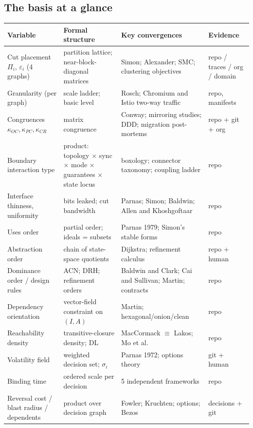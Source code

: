 \documentclass[11pt,oneside]{article}
\theoremstyle{definition}
\begin{document}
\subsection{The basis at a glance}

\begin{center}
\small
\begin{longtable}{@{}p{}p{}p{}p{}@{}}
\toprule
\textbf{Variable} & \textbf{Formal structure} & \textbf{Key convergences} & \textbf{Evidence} \\
\midrule
\endhead
Cut placement $\Pi_i$, $\varepsilon_i$ (4 graphs) & partition lattice; near-block-diagonal matrices & Simon; Alexander; SMC; clustering objectives & repo / traces / org / domain \\
Granularity (per graph) & scale ladder; basic level & Rosch; Chromium and Istio two-way traffic & repo, manifests \\
Congruences $\kappa_{OC},\kappa_{PC},\kappa_{CR}$ & matrix congruence & Conway; mirroring studies; DDD; migration post-mortems & repo + git + org \\
Boundary interaction type & product: topology $\times$ sync $\times$ mode $\times$ guarantees $\times$ state locus & boxology; connector taxonomy; coupling ladder & repo \\
Interface thinness, uniformity & bits leaked; cut bandwidth & Parnas; Simon; Baldwin; Allen and Khoshgoftaar & repo \\
Uses order & partial order; ideals = subsets & Parnas 1979; Simon's stable forms & repo \\
Abstraction order & chain of state-space quotients & Dijkstra; refinement calculus & repo + human \\
Dominance order / design rules & ACN; DRH; refinement orders & Baldwin and Clark; Cai and Sullivan; Martin; contracts & repo \\
Dependency orientation & vector-field constraint on $(I,A)$ & Martin; hexagonal/onion/clean & repo \\
Reachability density & transitive-closure density; DL & MacCormack $\equiv$ Lakos; Mo et al. & repo \\
Volatility field & weighted decision set; $\sigma_i$ & Parnas 1972; options theory & git + human \\
Binding time & ordered scale per decision & 5 independent frameworks & repo \\
Reversal cost / blast radius / dependents & product over decision graph & Fowler; Kruchten; options; Bezos & decisions + git \\

\end{longtable}
\end{center}
\end{document}
